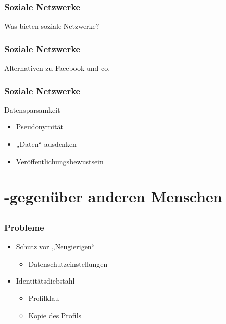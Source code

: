 \documentclass[12pt]{beamer}
\begin{document}
\begin{frame}
\begin{frame}
  \frametitle{Soziale Netzwerke}

  \begin{center} \Large
     Was bieten soziale Netzwerke?
  \end{center}
\end{frame}

\begin{frame}
  \frametitle{Soziale Netzwerke}

  \begin{center} \Large
   Alternativen zu Facebook und co.
  \end{center}
\end{frame}



\begin{frame}
  \frametitle{Soziale Netzwerke}
  \begin{center} \Large
     Datensparsamkeit 
     \begin{itemize}
     	\item Pseudonymität
	\item „Daten“ ausdenken 
	\item Veröffentlichungsbewustsein
     \end{itemize}
  \end{center}
\end{frame}

\section{-gegenüber anderen Menschen}
\subsection{}

\begin{frame}
	\frametitle{Probleme}

	\begin{itemize}
		\item Schutz vor „Neugierigen“
			\begin{itemize}
				\item Datenschutzeinstellungen
			\end{itemize}
		\item Identitätsdiebstahl
			\begin{itemize}
				\item Profilklau
				\item Kopie des Profils
			\end{itemize}
	\end{itemize}
\end{frame}


\end{frame}
\end{document}
